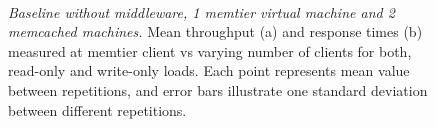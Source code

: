 \documentclass[11pt,a4paper]{article}
\begin{document}
\begin{figure}[ht!]
	\centering	
	\hfill
	\\
	\caption{\textit{Baseline without middleware, 1 memtier virtual machine and 2 memcached machines.} Mean throughput (a) and response times (b) measured at memtier client vs varying number of clients for both, read-only and write-only loads. Each point represents mean value between repetitions, and error bars illustrate one standard deviation between different repetitions.}
	\label{Figure:baseline_nomidd_2server} 	
\end{figure}
\end{document}
